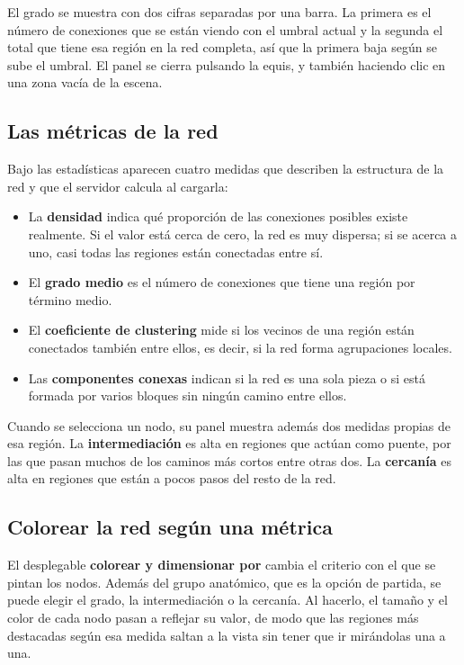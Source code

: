 El grado se muestra con dos cifras separadas por una barra. La primera es el número de conexiones que
se están viendo con el umbral actual y la segunda el total que tiene esa región en la red completa,
así que la primera baja según se sube el umbral. El panel se cierra pulsando la equis, y también
haciendo clic en una zona vacía de la escena.

\subsection{Las métricas de la red}

Bajo las estadísticas aparecen cuatro medidas que describen la estructura de la red y que el
servidor calcula al cargarla:

\begin{itemize}
	\item La \textbf{densidad} indica qué proporción de las conexiones posibles existe realmente. Si
		el valor está cerca de cero, la red es muy dispersa; si se acerca a uno, casi todas las
		regiones están conectadas entre sí.
	\item El \textbf{grado medio} es el número de conexiones que tiene una región por término medio.
	\item El \textbf{coeficiente de clustering} mide si los vecinos de una región están conectados
		también entre ellos, es decir, si la red forma agrupaciones locales.
	\item Las \textbf{componentes conexas} indican si la red es una sola pieza o si está formada por
		varios bloques sin ningún camino entre ellos.
\end{itemize}

Cuando se selecciona un nodo, su panel muestra además dos medidas propias de esa región. La
\textbf{intermediación} es alta en regiones que actúan como puente, por las que pasan muchos de los
caminos más cortos entre otras dos. La \textbf{cercanía} es alta en regiones que están a pocos pasos
del resto de la red.

\subsection{Colorear la red según una métrica}

El desplegable \textbf{colorear y dimensionar por} cambia el criterio con el que se pintan los nodos.
Además del grupo anatómico, que es la opción de partida, se puede elegir el grado, la intermediación
o la cercanía. Al hacerlo, el tamaño y el color de cada nodo pasan a reflejar su valor, de modo que
las regiones más destacadas según esa medida saltan a la vista sin tener que ir mirándolas una a una.

